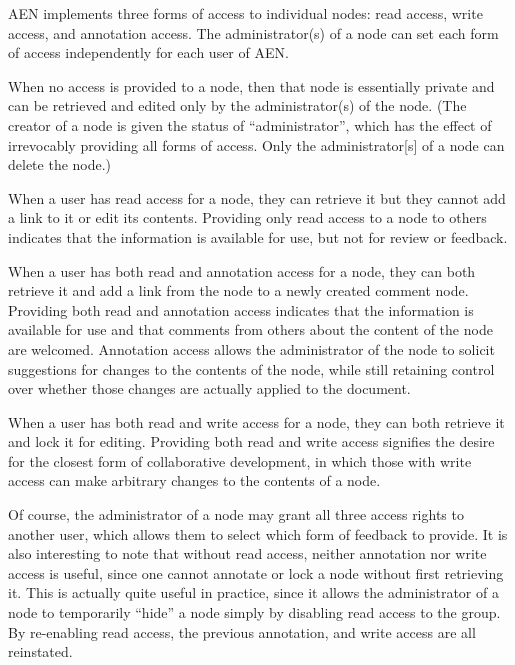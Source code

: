 AEN implements three forms of access to individual nodes: read access,
write access, and annotation access.  The administrator(s) of a node can set each
form of access independently for each user of AEN.

When no access is provided to a node, then that node is essentially
private and can be retrieved and edited only by the administrator(s) of the
node. (The creator of a node is given the status of ``administrator'', which
has the effect of irrevocably providing all forms of access. Only the
administrator[s] of a node can delete the node.)

When a user has read access for a node, they can retrieve it but they
cannot add a link to it or edit its contents. Providing only read access to
a node to others indicates that the information is available for use, but
not for review or feedback.

When a user has both read and annotation access for a node, they can both
retrieve it and add a link from the node to a newly created comment
node. Providing both read and annotation access indicates that the
information is available for use and that comments from others about the
content of the node are welcomed.  Annotation access allows the administrator of
the node to solicit suggestions for changes to the contents of the node,
while still retaining control over whether those changes are actually
applied to the document.

When a user has both read and write access for a node, they can both
retrieve it and lock it for editing.  Providing both read and write access
signifies the desire for the closest form of collaborative development, in
which those with write access can make arbitrary changes to the contents of
a node.

Of course, the administrator of a node may grant all three access rights to another
user, which allows them to select which form of feedback to provide.  It is
also interesting to note that without read access, neither annotation nor
write access is useful, since one cannot annotate or lock a node without
first retrieving it.  This is actually quite useful in practice, since it
allows the administrator of a node to temporarily ``hide'' a node simply by
disabling read access to the group.  By re-enabling read access, the
previous annotation, and write access are all reinstated.


